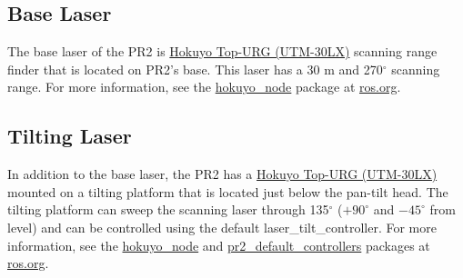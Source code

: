 \subsection{Base Laser}
The base laser of the PR2 is \href{http://www.hokuyo-aut.jp/02sensor/07scanner/utm_30lx.html}{Hokuyo Top-URG (UTM-30LX)} 
scanning range finder that is located on PR2's base. This laser has a 30 m and 270$^\circ$ scanning range. For more information, see the 
\href{http://www.ros.org/wiki/hokuyo_node}{hokuyo\_node} package at \href{http://www.ros.org}{ros.org}.

\subsection{Tilting Laser}
\label{tilting laser}
In addition to the base laser, the PR2 has a \href{http://www.hokuyo-aut.jp/02sensor/07scanner/utm_30lx.html}{Hokuyo Top-URG (UTM-30LX)}
mounted on a tilting platform that is located just below the pan-tilt head. The tilting platform can sweep the scanning 
laser through 135$^\circ$ ($+90^\circ$ and $-45^\circ$ from level) and can be controlled using the
default laser\_tilt\_controller. For more information, see the \href{http://www.ros.org/wiki/hokuyo_node}{hokuyo\_node} 
and \href{http://www.ros.org/wiki/pr2_default_controllers}{pr2\_default\_controllers} packages at \href{http://www.ros.org}{ros.org}.

